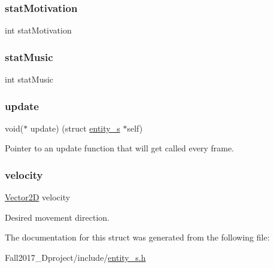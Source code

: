 \subsubsection{\texorpdfstring{stat\+Motivation}{statMotivation}}
{\footnotesize\ttfamily int stat\+Motivation}

\mbox{\label{structentity__s_ae5341e0b53331ca3c7e81726895e68fa}} 
\subsubsection{\texorpdfstring{stat\+Music}{statMusic}}
{\footnotesize\ttfamily int stat\+Music}

\mbox{\label{structentity__s_ae4dad0223ba78dddff3177bd20960ff2}} 
\subsubsection{\texorpdfstring{update}{update}}
{\footnotesize\ttfamily void($\ast$ update) (struct \hyperlink{structentity__s}{entity\+\_\+s} $\ast$self)}



Pointer to an update function that will get called every frame. 

\mbox{\label{structentity__s_a5b7790a4c9666f321ce2228f1b8bd118}} 
\subsubsection{\texorpdfstring{velocity}{velocity}}
{\footnotesize\ttfamily \hyperlink{struct_vector2_d}{Vector2D} velocity}



Desired movement direction. 



The documentation for this struct was generated from the following file\+:\begin{DoxyCompactItemize}
\item 
Fall2017\+\_\+Dproject/include/\hyperlink{entity__s_8h}{entity\+\_\+s.\+h}\end{DoxyCompactItemize}
